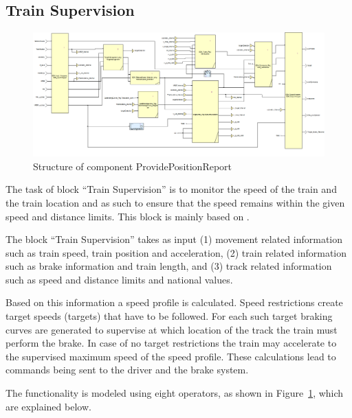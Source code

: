 
\subsection{Train Supervision}

\begin{figure}
\centering
\includegraphics[width=0.95\textheight, angle=90]{../images/speedsupervision.png}
\caption{Structure of component ProvidePositionReport}\label{fig:ssv}
\end{figure}

The task of block ``Train Supervision'' is to monitor the speed of the train and the train location and as such to ensure that the speed remains within the given speed and distance limits. This block is mainly based on \cite[Chapt.~3.13]{subset-026}.

The block ``Train Supervision'' takes as input (1) movement related information such as train speed, train position and acceleration, (2) train related information such as brake information and train length, and (3) track related information such as speed and distance limits and national values.

Based on this information a speed profile is calculated. Speed restrictions create target speeds (targets) that have to be followed. For each such target braking curves are generated to supervise at which location of the track the train must perform the brake. In case of no target restrictions the train may accelerate to the supervised maximum speed of the speed profile. These calculations lead to commands being sent to the driver and the brake system.

The functionality is modeled using eight operators, as shown in Figure~\ref{fig:ssv}, which are explained below.


